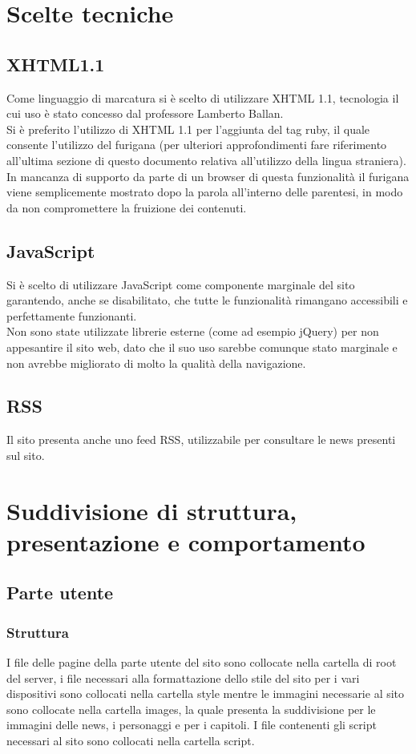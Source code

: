 \documentclass[openany, a4paper, 12pt]{report}
\begin{document}
	\section{Scelte tecniche}
		\subsection{XHTML1.1}
		Come linguaggio di marcatura si è scelto di utilizzare XHTML 1.1, tecnologia il cui uso è stato concesso dal professore Lamberto Ballan.\\
		Si è preferito l'utilizzo di XHTML 1.1 per l'aggiunta del tag ruby, il quale consente l'utilizzo del furigana (per ulteriori approfondimenti fare riferimento all'ultima sezione di questo documento relativa all'utilizzo della lingua straniera).\\
		In mancanza di supporto da parte di un browser di questa funzionalità il furigana viene semplicemente mostrato dopo la parola all'interno delle parentesi, in modo da non compromettere la fruizione dei contenuti.

		\subsection{JavaScript}
		Si è scelto di utilizzare JavaScript come componente marginale del sito garantendo, anche se disabilitato, che tutte le funzionalità rimangano accessibili e perfettamente funzionanti.\\
		Non sono state utilizzate librerie esterne (come ad esempio jQuery) per non appesantire il sito web, dato che il suo uso sarebbe comunque stato marginale e non avrebbe migliorato di molto la qualità della navigazione.
		
		\subsection{RSS}
		Il sito presenta anche uno feed RSS, utilizzabile per consultare le news presenti sul sito.

	\section{Suddivisione di struttura, presentazione e comportamento}
		\subsection{Parte utente}
			\subsubsection{Struttura}
			I file delle pagine della parte utente del sito sono collocate nella cartella di root del server, i file necessari alla formattazione dello stile del sito per i vari dispositivi sono collocati nella cartella style mentre le immagini necessarie al sito sono collocate nella cartella images, la quale presenta la suddivisione per le immagini delle news, i personaggi e per i capitoli. I file contenenti gli script necessari al sito sono collocati nella cartella script.
\end{document}
